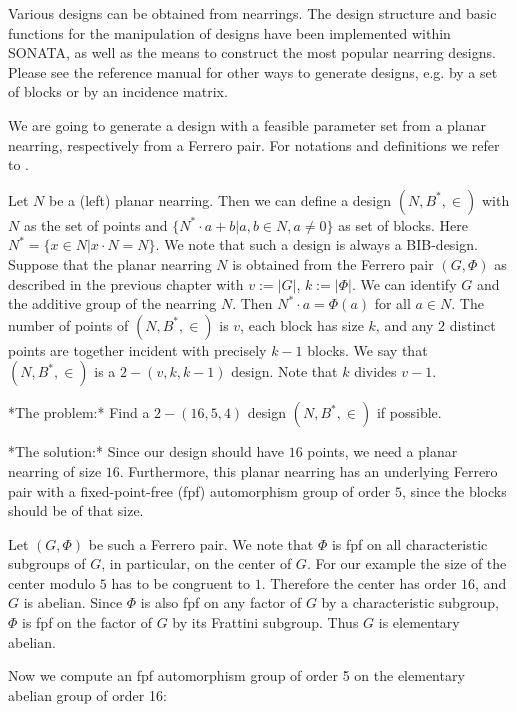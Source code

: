 %
%


Various designs can be obtained from nearrings. The design structure and 
basic functions for the manipulation of designs have been implemented within 
SONATA, as well as the means to construct the most popular nearring designs.
Please see the reference manual for other ways to generate designs, e.g.
by a set of blocks or by an incidence matrix.



We are going to generate a design with a feasible parameter set from a planar 
nearring, respectively from a Ferrero pair.
For notations and definitions we refer to \cite{Clay:Nearrings}.

Let $N$ be a (left) planar nearring. Then we can define a design
$(N,B^{*},\in)$ with $N$ as the set of points and
$\{N^{*}\cdot a+b | a,b\in N, a \not= 0 \}$ as set of blocks.
Here $N^{*} = \{ x\in N | x\cdot N = N \}$.
We note that such a design is always a BIB-design. Suppose that the planar
nearring $N$ is obtained from the Ferrero pair $(G,\Phi)$ as described in the
previous chapter with $v := |G|$, $k := |\Phi|$. 
We can identify $G$ and the additive group of the nearring $N$.
Then $N^{*}\cdot a = \Phi(a)$ for all $a\in N$. The number of points of
$(N,B^{*},\in)$ is $v$, each block has size $k$, and any $2$ distinct points
are together incident with precisely $k-1$ blocks. We say that $(N,B^{*},\in)$
is a $2-(v,k,k-1)$ design. Note that $k$ divides $v-1$.

*The problem:*
Find a $2-(16,5,4)$ design $(N,B^{*},\in)$ if possible.

*The solution:*
Since our design should have $16$ points, we need a planar nearring of size 
$16$. Furthermore, this planar nearring has an underlying Ferrero pair with
a fixed-point-free (fpf) automorphism group of order $5$, since the blocks 
should be of that size. 

Let $(G,\Phi)$ be such a Ferrero pair.
We note that $\Phi$ is fpf on all characteristic subgroups of $G$, in 
particular, on the center of $G$. For our example the size of the center
modulo $5$ has to be congruent to $1$. Therefore the center has order $16$,
and $G$ is abelian.
Since $\Phi$ is also fpf on any factor of $G$ by a characteristic subgroup,
$\Phi$ is fpf on the factor of $G$ by its Frattini subgroup. 
Thus $G$ is elementary abelian.

Now we compute an fpf automorphism group of order 5 on the elementary abelian
group of order 16:


